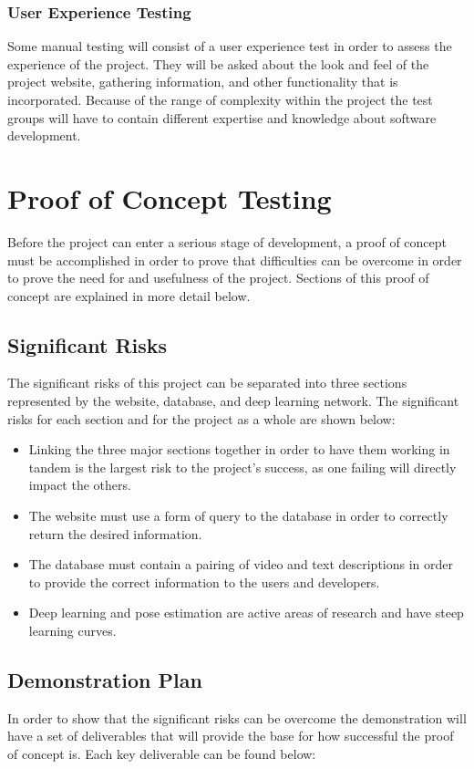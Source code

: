 \documentclass{scrreprt}
\begin{document}
\subsection{User Experience Testing}
Some manual testing will consist of a user experience test in order to assess the experience of the project. They will be asked about the look and feel of the project website, gathering information, and other functionality that is incorporated. Because of the range of complexity within the project the test groups will have to contain different expertise and knowledge about software development.

\chapter{Proof of Concept Testing}
Before the project can enter a serious stage of development, a proof of concept must be accomplished in order to prove that difficulties can be overcome in order to prove the need for and usefulness of the project. Sections of this proof of concept are explained in more detail below.

\section{Significant Risks}
The significant risks of this project can be separated into three sections represented by the website, database, and deep learning network. The significant risks for each section and for the project as a whole are shown below:

\begin{itemize}
  \item Linking the three major sections together in order to have them working in tandem is the largest risk to the project's success, as one failing will directly impact the others.
  \item The website must use a form of query to the database in order to correctly return the desired information.
  \item The database must contain a pairing of video and text descriptions in order to provide the correct information to the users and developers.
  \item Deep learning and pose estimation are active areas of research and have
          steep learning curves.
\end{itemize}

\section{Demonstration Plan}
In order to show that the significant risks can be overcome the demonstration will have a set of deliverables that will provide the base for how successful the proof of concept is. Each key deliverable can be found below:
\end{document}
